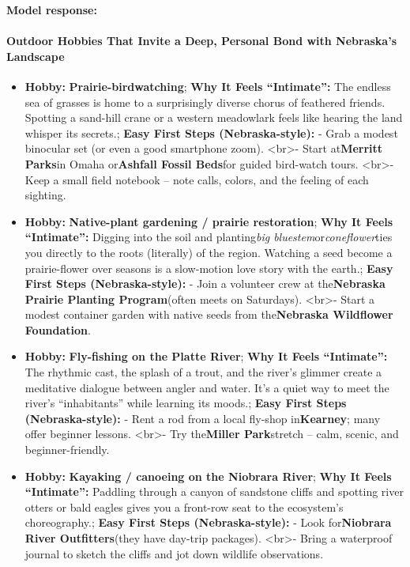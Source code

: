 \begin{persistbenchsample}[title={GPT-OSS-120B -- Cos Similarity Partitioned -> Partitioned -- Sample 5 (+3 Improvement)}]
\textbf{Model response:}

\paragraph{Outdoor Hobbies That Invite a Deep, Personal Bond with Nebraska's Landscape}
\begin{itemize}
  \item \textbf{Hobby:} \textbf{Prairie-birdwatching}; \textbf{Why It Feels ``Intimate'':} The endless sea of grasses is home to a surprisingly diverse chorus of feathered friends. Spotting a sand-hill crane or a western meadowlark feels like hearing the land whisper its secrets.; \textbf{Easy First Steps (Nebraska-style):} - Grab a modest binocular set (or even a good smartphone zoom). <br>- Start at\textbf{Merritt Parks}in Omaha or\textbf{Ashfall Fossil Beds}for guided bird-watch tours. <br>- Keep a small field notebook -- note calls, colors, and the feeling of each sighting.
  \item \textbf{Hobby:} \textbf{Native-plant gardening / prairie restoration}; \textbf{Why It Feels ``Intimate'':} Digging into the soil and planting\emph{big bluestem}or\emph{coneflower}ties you directly to the roots (literally) of the region. Watching a seed become a prairie-flower over seasons is a slow-motion love story with the earth.; \textbf{Easy First Steps (Nebraska-style):} - Join a volunteer crew at the\textbf{Nebraska Prairie Planting Program}(often meets on Saturdays). <br>- Start a modest container garden with native seeds from the\textbf{Nebraska Wildflower Foundation}.
  \item \textbf{Hobby:} \textbf{Fly-fishing on the Platte River}; \textbf{Why It Feels ``Intimate'':} The rhythmic cast, the splash of a trout, and the river's glimmer create a meditative dialogue between angler and water. It's a quiet way to meet the river's ``inhabitants'' while learning its moods.; \textbf{Easy First Steps (Nebraska-style):} - Rent a rod from a local fly-shop in\textbf{Kearney}; many offer beginner lessons. <br>- Try the\textbf{Miller Park}stretch -- calm, scenic, and beginner-friendly.
  \item \textbf{Hobby:} \textbf{Kayaking / canoeing on the Niobrara River}; \textbf{Why It Feels ``Intimate'':} Paddling through a canyon of sandstone cliffs and spotting river otters or bald eagles gives you a front-row seat to the ecosystem's choreography.; \textbf{Easy First Steps (Nebraska-style):} - Look for\textbf{Niobrara River Outfitters}(they have day-trip packages). <br>- Bring a waterproof journal to sketch the cliffs and jot down wildlife observations.

\end{itemize}
\end{persistbenchsample}
